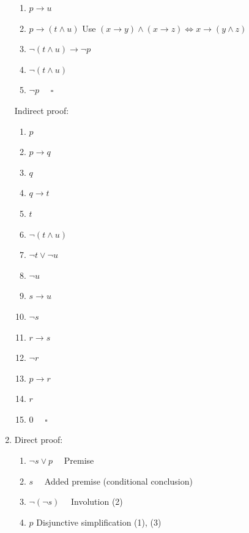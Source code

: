 \documentclass[10pt,]{book}
\theoremstyle{plain}
\theoremstyle{definition}
\theoremstyle{definition}
\theoremstyle{definition}
\theoremstyle{definition}
\begin{document}
\begin{exercisegroup}
\begin{enumerate}[label=\alph*]
\begin{enumerate}[label=\arabic*]
\item\hypertarget{li-158}{}\(p\to u\)%
\item\hypertarget{li-159}{}\(p\to (t\land u)\) Use \((x\to y)\land (x\to z)\Leftrightarrow x\to (y\land z)\)%
\item\hypertarget{li-160}{} \(\neg (t\land u)\to \neg p\)%
\item\hypertarget{li-161}{} \(\neg (t\land u)\)%
\item\hypertarget{li-162}{}\(\neg p\) \(\quad \square\)%
\end{enumerate}
%
\par
Indirect proof:%
\par
%
\begin{enumerate}[label=\arabic*]
\item\hypertarget{li-163}{}  \(p\)%
\item\hypertarget{li-164}{} \(p\to q\)%
\item\hypertarget{li-165}{} \(q\)%
\item\hypertarget{li-166}{}\(q\to t\)%
\item\hypertarget{li-167}{} \(t\)%
\item\hypertarget{li-168}{} \(\neg (t\land u)\)%
\item\hypertarget{li-169}{}\(\neg t\lor \neg u\)%
\item\hypertarget{li-170}{} \(\neg u\)%
\item\hypertarget{li-171}{} \(s\to u\)%
\item\hypertarget{li-172}{} \(\neg s\)%
\item\hypertarget{li-173}{}\(r\to s\)%
\item\hypertarget{li-174}{} \(\neg r\)%
\item\hypertarget{li-175}{} \(p\to r\)%
\item\hypertarget{li-176}{}\(r\)%
\item\hypertarget{li-177}{} \(0\) \(\quad \square\)%
\end{enumerate}
%
\item\hypertarget{li-178}{} Direct proof:%
\par
%
\begin{enumerate}[label=\arabic*]
\item\hypertarget{li-179}{} \(\neg s\lor p\quad \)   Premise%
\item\hypertarget{li-180}{} \(s\quad \)    Added premise (conditional conclusion)%
\item\hypertarget{li-181}{} \(\neg (\neg s)\quad \)   Involution (2)%
\item\hypertarget{li-182}{} \(p\)  \quad  Disjunctive simplification (1), (3)%

\end{enumerate}
\end{enumerate}
\end{exercisegroup}
\end{document}
